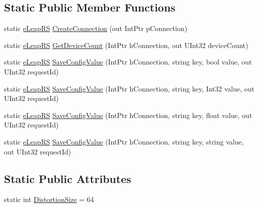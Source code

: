 \subsection*{Static Public Member Functions}
\begin{DoxyCompactItemize}
\item 
static \mbox{\hyperlink{namespace_leap_internal_ae50b07d24c508b84273392b6dcbea1d9}{e\+Leap\+RS}} \mbox{\hyperlink{class_leap_internal_1_1_leap_c_a6f1283109b988f2358c4c292004a3af1}{Create\+Connection}} (out Int\+Ptr p\+Connection)
\item 
static \mbox{\hyperlink{namespace_leap_internal_ae50b07d24c508b84273392b6dcbea1d9}{e\+Leap\+RS}} \mbox{\hyperlink{class_leap_internal_1_1_leap_c_ab705081937bf1a4cf7f69f3298991c5a}{Get\+Device\+Count}} (Int\+Ptr h\+Connection, out U\+Int32 device\+Count)
\item 
static \mbox{\hyperlink{namespace_leap_internal_ae50b07d24c508b84273392b6dcbea1d9}{e\+Leap\+RS}} \mbox{\hyperlink{class_leap_internal_1_1_leap_c_a7483990e8538c017a4167fd7c2071c19}{Save\+Config\+Value}} (Int\+Ptr h\+Connection, string key, bool value, out U\+Int32 request\+Id)
\item 
static \mbox{\hyperlink{namespace_leap_internal_ae50b07d24c508b84273392b6dcbea1d9}{e\+Leap\+RS}} \mbox{\hyperlink{class_leap_internal_1_1_leap_c_a61a4388b720d9d0741a89e16cd93da8b}{Save\+Config\+Value}} (Int\+Ptr h\+Connection, string key, Int32 value, out U\+Int32 request\+Id)
\item 
static \mbox{\hyperlink{namespace_leap_internal_ae50b07d24c508b84273392b6dcbea1d9}{e\+Leap\+RS}} \mbox{\hyperlink{class_leap_internal_1_1_leap_c_a8638f4fd67973976b28d8c3b3beb4486}{Save\+Config\+Value}} (Int\+Ptr h\+Connection, string key, float value, out U\+Int32 request\+Id)
\item 
static \mbox{\hyperlink{namespace_leap_internal_ae50b07d24c508b84273392b6dcbea1d9}{e\+Leap\+RS}} \mbox{\hyperlink{class_leap_internal_1_1_leap_c_a339a87259347a44276f4bba6b50e2509}{Save\+Config\+Value}} (Int\+Ptr h\+Connection, string key, string value, out U\+Int32 request\+Id)
\end{DoxyCompactItemize}
\subsection*{Static Public Attributes}
\begin{DoxyCompactItemize}
\item 
static int \mbox{\hyperlink{class_leap_internal_1_1_leap_c_a7ac94774e89ba537bf4d7a539315bd2a}{Distortion\+Size}} = 64
\end{DoxyCompactItemize}


